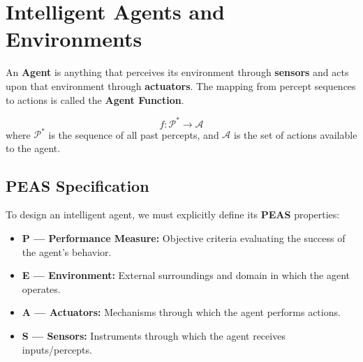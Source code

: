 \documentclass[12pt,a4paper]{article}
\begin{document}
\section{Intelligent Agents and Environments}

\begin{tcolorbox}[defbox, title={Definition of an Agent}]
  An \textbf{Agent} is anything that perceives its environment through \textbf{sensors} and acts upon that environment through \textbf{actuators}. The mapping from percept sequences to actions is called the \textbf{Agent Function}.
\end{tcolorbox}

\begin{tcolorbox}[formulabox, title={Mathematical Formulation of an Agent}]
  \begin{equation}
    f: \mathcal{P}^* \to \mathcal{A}
  \end{equation}
  where $\mathcal{P}^*$ is the sequence of all past percepts, and $\mathcal{A}$ is the set of actions available to the agent.
\end{tcolorbox}

\begin{tcolorbox}[tikzbox, title={Agent-Environment Interaction Loop}]
\centering
{}
\end{tcolorbox}

\subsection{PEAS Specification}
To design an intelligent agent, we must explicitly define its \textbf{PEAS} properties:
\begin{itemize}[leftmargin=*, itemsep=3pt]
  \item \textbf{P --- Performance Measure:} Objective criteria evaluating the success of the agent's behavior.
  \item \textbf{E --- Environment:} External surroundings and domain in which the agent operates.
  \item \textbf{A --- Actuators:} Mechanisms through which the agent performs actions.
  \item \textbf{S --- Sensors:} Instruments through which the agent receives inputs/percepts.
\end{itemize}
\end{document}
